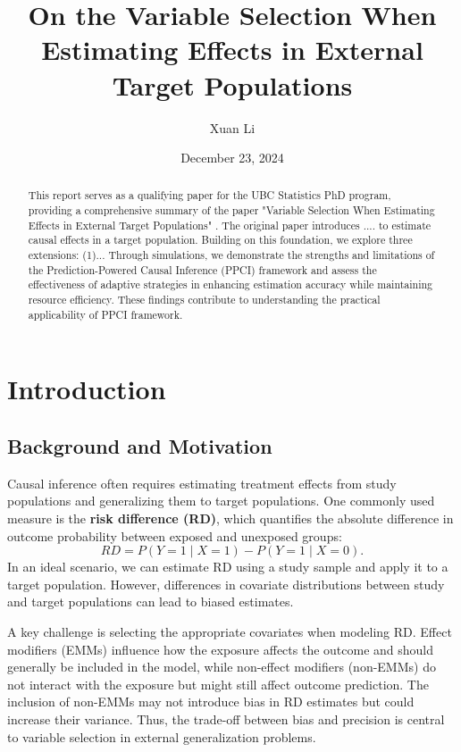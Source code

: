 \documentclass[12pt, oneside]{amsart}
\title{On the Variable Selection When Estimating Effects in External Target Populations}
\author{Xuan Li}
\date{December 23, 2024}
\theoremstyle{definition}
\theoremstyle{remark}
\numberwithin{equation}{section}
\begin{document}
\begin{abstract}
    This report serves as a qualifying paper for the UBC Statistics PhD program, providing a comprehensive summary of the paper "Variable Selection When Estimating Effects in External Target Populations" \citep{qp}. The original paper introduces .... to estimate causal effects in a target population. Building on this foundation, we explore three extensions: (1)... Through simulations, we demonstrate the strengths and limitations of the Prediction-Powered Causal Inference (PPCI) framework and assess the effectiveness of adaptive strategies in enhancing estimation accuracy while maintaining resource efficiency. These findings contribute to understanding the practical applicability of PPCI framework.
\end{abstract}
\maketitle
\tableofcontents



\section{Introduction}

\subsection{Background and Motivation}

Causal inference often requires estimating treatment effects from study populations and generalizing them to target populations. One commonly used measure is the \textbf{risk difference (RD)}, which quantifies the absolute difference in outcome probability between exposed and unexposed groups:
\begin{equation}
    RD = P(Y = 1 \mid X = 1) - P(Y = 1 \mid X = 0).
\end{equation}
In an ideal scenario, we can estimate RD using a study sample and apply it to a target population. However, differences in covariate distributions between study and target populations can lead to biased estimates.

A key challenge is selecting the appropriate covariates when modeling RD. Effect modifiers (EMMs) influence how the exposure affects the outcome and should generally be included in the model, while non-effect modifiers (non-EMMs) do not interact with the exposure but might still affect outcome prediction. The inclusion of non-EMMs may not introduce bias in RD estimates but could increase their variance. Thus, the trade-off between bias and precision is central to variable selection in external generalization problems.
\end{document}
